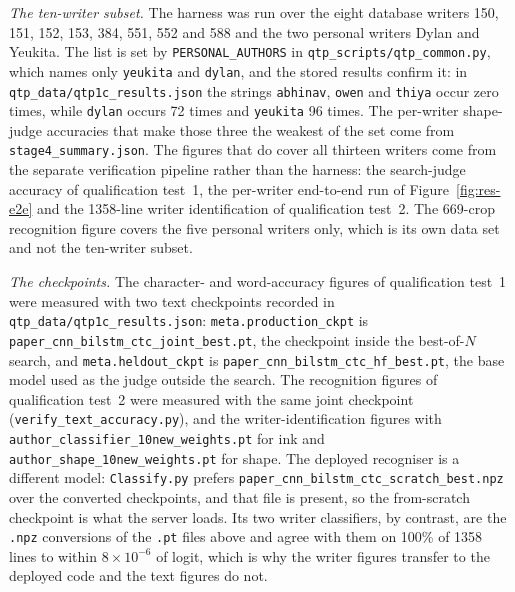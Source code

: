\emph{The ten-writer subset.}
The harness was run over the eight database writers 150, 151, 152, 153, 384, 551, 552 and 588 and the two personal writers Dylan and Yeukita.
The list is set by \texttt{PERSONAL\_AUTHORS} in \texttt{qtp\_scripts/qtp\_common.py}, which names only \texttt{yeukita} and \texttt{dylan}, and the stored results confirm it: in \texttt{qtp\_data/qtp1c\_results.json} the strings \texttt{abhinav}, \texttt{owen} and \texttt{thiya} occur zero times, while \texttt{dylan} occurs 72 times and \texttt{yeukita} 96 times.
The per-writer shape-judge accuracies that make those three the weakest of the set come from \texttt{stage4\_summary.json}.
The figures that do cover all thirteen writers come from the separate verification pipeline rather than the harness: the search-judge accuracy of qualification test~1, the per-writer end-to-end run of Figure~\ref{fig:res-e2e} and the 1358-line writer identification of qualification test~2.
The 669-crop recognition figure covers the five personal writers only, which is its own data set and not the ten-writer subset.

\emph{The checkpoints.}
The character- and word-accuracy figures of qualification test~1 were measured with two text checkpoints recorded in \texttt{qtp\_data/qtp1c\_results.json}: \texttt{meta.production\_ckpt} is \texttt{paper\_cnn\_bilstm\_ctc\_joint\_best.pt}, the checkpoint inside the best-of-$N$ search, and \texttt{meta.heldout\_ckpt} is \texttt{paper\_cnn\_bilstm\_ctc\_hf\_best.pt}, the base model used as the judge outside the search.
The recognition figures of qualification test~2 were measured with the same joint checkpoint (\texttt{verify\_text\_accuracy.py}), and the writer-identification figures with \texttt{author\_classifier\_10new\_weights.pt} for ink and \texttt{author\_shape\_10new\_weights.pt} for shape.
The deployed recogniser is a different model: \texttt{Classify.py} prefers \texttt{paper\_cnn\_bilstm\_ctc\_scratch\_best.npz} over the converted checkpoints, and that file is present, so the from-scratch checkpoint is what the server loads.
Its two writer classifiers, by contrast, are the \texttt{.npz} conversions of the \texttt{.pt} files above and agree with them on 100\% of 1358 lines to within $8\times10^{-6}$ of logit, which is why the writer figures transfer to the deployed code and the text figures do not.

